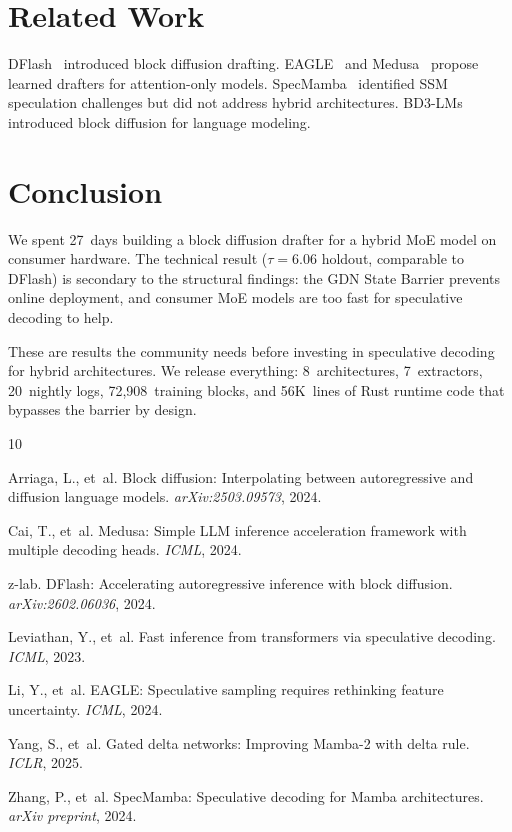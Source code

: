 \documentclass[10pt,a4paper]{article}
\begin{document}
\section{Related Work}

DFlash~\cite{dflash2024} introduced block diffusion drafting. EAGLE~\cite{li2024eagle} and Medusa~\cite{cai2024medusa} propose learned drafters for attention-only models. SpecMamba~\cite{zhang2024specmamba} identified SSM speculation challenges but did not address hybrid architectures. BD3-LMs~\cite{arriaga2024block} introduced block diffusion for language modeling.

\section{Conclusion}

We spent 27~days building a block diffusion drafter for a hybrid MoE model on consumer hardware. The technical result ($\tau{=}6.06$ holdout, comparable to DFlash) is secondary to the structural findings: the GDN State Barrier prevents online deployment, and consumer MoE models are too fast for speculative decoding to help.

These are results the community needs before investing in speculative decoding for hybrid architectures. We release everything: 8~architectures, 7~extractors, 20~nightly logs, 72{,}908~training blocks, and 56K~lines of Rust runtime code that bypasses the barrier by design.

\begin{thebibliography}{10}

Arriaga, L., et~al.
Block diffusion: Interpolating between autoregressive and diffusion language models.
\emph{arXiv:2503.09573}, 2024.

Cai, T., et~al.
Medusa: Simple LLM inference acceleration framework with multiple decoding heads.
\emph{ICML}, 2024.

z-lab.
DFlash: Accelerating autoregressive inference with block diffusion.
\emph{arXiv:2602.06036}, 2024.

Leviathan, Y., et~al.
Fast inference from transformers via speculative decoding.
\emph{ICML}, 2023.

Li, Y., et~al.
EAGLE: Speculative sampling requires rethinking feature uncertainty.
\emph{ICML}, 2024.

Yang, S., et~al.
Gated delta networks: Improving Mamba-2 with delta rule.
\emph{ICLR}, 2025.

Zhang, P., et~al.
SpecMamba: Speculative decoding for Mamba architectures.
\emph{arXiv preprint}, 2024.

\end{thebibliography}
\end{document}
